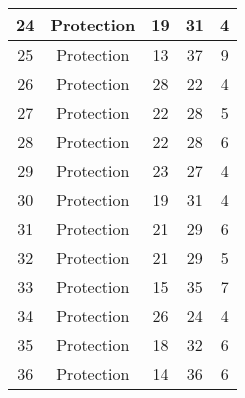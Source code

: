 \documentclass[results.tex]{subfiles}
\begin{document}
\begin{center}
\begin{tabular}{| c || c | c | c | c |}
            \hline
            24                      & Protection                   & 19                     & 31                      & 4                    \\
            \hline
            25                      & Protection                   & 13                     & 37                      & 9                    \\
            \hline
            26                      & Protection                   & 28                     & 22                      & 4                    \\
            \hline
            27                      & Protection                   & 22                     & 28                      & 5                    \\
            \hline
            28                      & Protection                   & 22                     & 28                      & 6                    \\
            \hline
            29                      & Protection                   & 23                     & 27                      & 4                    \\
            \hline
            30                      & Protection                   & 19                     & 31                      & 4                    \\
            \hline
            31                      & Protection                   & 21                     & 29                      & 6                    \\
            \hline
            32                      & Protection                   & 21                     & 29                      & 5                    \\
            \hline
            33                      & Protection                   & 15                     & 35                      & 7                    \\
            \hline
            34                      & Protection                   & 26                     & 24                      & 4                    \\
            \hline
            35                      & Protection                   & 18                     & 32                      & 6                    \\
            \hline
            36                      & Protection                   & 14                     & 36                      & 6                    \\

\end{tabular}
\end{center}
\end{document}
